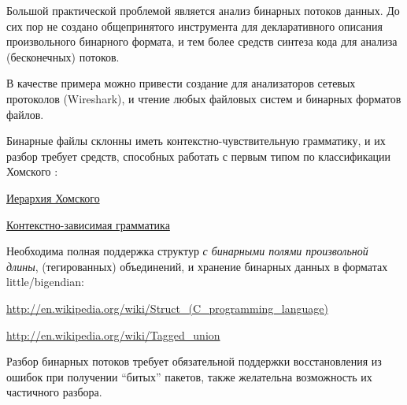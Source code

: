 \label{binparse}

Большой практической проблемой является анализ бинарных потоков данных. До сих
пор не создано общепринятого инструмента для декларативного описания
произвольного бинарного формата, и тем более средств синтеза кода для анализа
(бесконечных) потоков.

В качестве примера можно привести создание  для анализаторов
сетевых протоколов (Wireshark), и чтение любых файловых систем и бинарных
форматов файлов.
 
Бинарные файлы склонны иметь контекстно-чувствительную грамматику, и их разбор
требует средств, способных работать с первым типом по классификации Хомского
\cite{serlex}:

\medskip
\noindent
\href{http://ru.wikipedia.org/wiki/%D0%98%D0%B5%D1%80%D0%B0%D1%80%D1%85%D0%B8%D1%8F_%D0%A5%D0%BE%D0%BC%D1%81%D0%BA%D0%BE%D0%B3%D0%BE}{Иерархия
Хомского} 

\noindent
\href{https://ru.wikipedia.org/wiki/%D0%9A%D0%BE%D0%BD%D1%82%D0%B5%D0%BA%D1%81%D1%82%D0%BD%D0%BE-%D0%B7%D0%B0%D0%B2%D0%B8%D1%81%D0%B8%D0%BC%D0%B0%D1%8F_%D0%B3%D1%80%D0%B0%D0%BC%D0%BC%D0%B0%D1%82%D0%B8%D0%BA%D0%B0}{Контекстно-зависимая
грамматика}

\clearpage
Необходима полная поддержка структур \emph{с бинарными полями произвольной
длины}, (тегированных) объединений, и хранение бинарных данных в форматах
little/bigendian:

\noindent
\url{http://en.wikipedia.org/wiki/Struct_(C_programming_language)}

\noindent
\url{http://en.wikipedia.org/wiki/Tagged_union}

\bigskip
Разбор бинарных потоков требует обязательной поддержки восстановления из
ошибок при получении ``битых'' пакетов, также желательна возможность
их частичного разбора.
